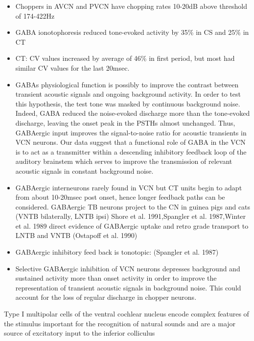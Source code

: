 \documentclass[10pt,a4paper]{article}
\newcommand\textstylebibrecordhighlight[1]{#1}
\begin{document}
\begin{itemize}
\item Choppers in AVCN and PVCN have chopping rates 10-20dB above threshold of
  174-422Hz
\item GABA ionotophoresis reduced tone-evoked activity by 35\% in CS and 25\% in
  CT
\item CT: CV values increased by average of 46\% in first period, but most had
  similar CV values for the last 20msec.
\item \textstylebibrecordhighlight{GABA}{\textquotesingle}s physiological
  function is possibly to improve the contrast between transient acoustic
  signals and ongoing background activity. In order to test this hypothesis, the
  test tone was masked by continuous background noise. Indeed,
  \textstylebibrecordhighlight{GABA} reduced the noise-evoked discharge more
  than the tone-evoked discharge, leaving the onset peak in the PSTHs almost
  unchanged. Thus, \textstylebibrecordhighlight{GABA}ergic input improves the
  signal-to-noise ratio for acoustic transients in VCN neurons. Our data suggest
  that a functional role of \textstylebibrecordhighlight{GABA} in the VCN is to
  act as a transmitter within a descending inhibitory feedback loop of the
  auditory brainstem which serves to improve the transmission of relevant
  acoustic signals in constant background noise.
\item GABAergic interneurons rarely found in VCN
  \citep{AdamsMugnaini:1987,Moore:1987} but CT units begin to adapt from about
  10-20msec post onset, hence longer feedback paths can be considered.
  GABAergic TB neurons project to the CN in guinea pigs and cats (VNTB
  bilaterally, LNTB ipsi) \citep{Adams:1983a} {Shore et al. 1991,Spangler et
    al. 1987,Winter et al. 1989} direct evidence of GABAergic uptake and retro
  grade transport to LNTB and VNTB (Ostapoff et al. 1990)
\item GABAergic inhibitory feed back is tonotopic: (Spangler et al.  1987)
\item Selective GABAergic inhibition of VCN neurons depresses background and
  sustained activity more than onset activity in order to improve the
  representation of transient acoustic signals in background noise.  This could
  account for the loss of regular discharge in chopper neurons.
\end{itemize}
\citep{CantBenson:2003} Type I multipolar cells of the ventral cochlear nucleus
encode complex features of the stimulus important for the recognition of natural
sounds and are a major source of excitatory input to the inferior colliculus
\end{document}
